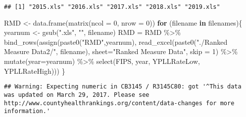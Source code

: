 \documentclass[
]{article}
\newenvironment{Shaded}{\begin{snugshade}}{\end{snugshade}}
\newcommand{\AttributeTok}[1]{\textcolor[rgb]{0.77,0.63,0.00}{#1}}
\newcommand{\ControlFlowTok}[1]{\textcolor[rgb]{0.13,0.29,0.53}{\textbf{#1}}}
\newcommand{\DecValTok}[1]{\textcolor[rgb]{0.00,0.00,0.81}{#1}}
\newcommand{\FunctionTok}[1]{\textcolor[rgb]{0.00,0.00,0.00}{#1}}
\newcommand{\NormalTok}[1]{#1}
\newcommand{\OtherTok}[1]{\textcolor[rgb]{0.56,0.35,0.01}{#1}}
\newcommand{\SpecialCharTok}[1]{\textcolor[rgb]{0.00,0.00,0.00}{#1}}
\newcommand{\StringTok}[1]{\textcolor[rgb]{0.31,0.60,0.02}{#1}}
\begin{document}
\begin{verbatim}
## [1] "2015.xls" "2016.xls" "2017.xls" "2018.xls" "2019.xls"
\end{verbatim}

\begin{Shaded}
\begin{Highlighting}[]
\NormalTok{RMD }\OtherTok{\textless{}{-}} \FunctionTok{data.frame}\NormalTok{(}\FunctionTok{matrix}\NormalTok{(}\AttributeTok{ncol =} \DecValTok{0}\NormalTok{, }\AttributeTok{nrow =} \DecValTok{0}\NormalTok{))}
\ControlFlowTok{for}\NormalTok{ (filename }\ControlFlowTok{in}\NormalTok{ filenames)\{  }
\NormalTok{   yearnum }\OtherTok{\textless{}{-}} \FunctionTok{gsub}\NormalTok{(}\StringTok{".xls"}\NormalTok{, }\StringTok{""}\NormalTok{, filename)  }
\NormalTok{   RMD }\OtherTok{=}\NormalTok{ RMD }\SpecialCharTok{\%\textgreater{}\%} \FunctionTok{bind\_rows}\NormalTok{(}\FunctionTok{assign}\NormalTok{(}\FunctionTok{paste0}\NormalTok{(}\StringTok{"RMD"}\NormalTok{,yearnum), }\FunctionTok{read\_excel}\NormalTok{(}\FunctionTok{paste0}\NormalTok{(}\StringTok{"./Ranked Measure Data2/"}\NormalTok{, filename), }\AttributeTok{sheet=}\StringTok{"Ranked Measure Data"}\NormalTok{, }\AttributeTok{skip =} \DecValTok{1}\NormalTok{) }\SpecialCharTok{\%\textgreater{}\%}
            \FunctionTok{mutate}\NormalTok{(}\AttributeTok{year=}\NormalTok{yearnum) }\SpecialCharTok{\%\textgreater{}\%} 
            \FunctionTok{select}\NormalTok{(FIPS, year, YPLLRateLow, YPLLRateHigh)))}
\NormalTok{\}}
\end{Highlighting}
\end{Shaded}

\begin{verbatim}
## Warning: Expecting numeric in CB3145 / R3145C80: got '^This data was updated on March 29, 2017. Please see http://www.countyhealthrankings.org/content/data-changes for more information.'
\end{verbatim}
\end{document}
